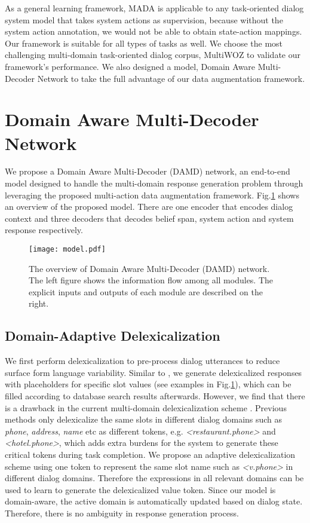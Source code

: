\documentclass[letterpaper]{article} \usepackage{aaai20}  \usepackage{times}  \usepackage{helvet} \usepackage{courier}  \usepackage[hyphens]{url}  \usepackage{graphicx} \urlstyle{rm} \def\UrlFont{\rm}  \usepackage{graphicx}  \frenchspacing  \setlength{\pdfpagewidth}{8.5in}  \setlength{\pdfpageheight}{11in}  \usepackage{multirow}
\begin{document}
	
	
	
	
	As a general learning framework, MADA is applicable to any task-oriented dialog system model that takes system actions as supervision, because without the system action annotation, we would not be able to obtain state-action mappings.  
	Our framework is suitable for all types of tasks as well. We choose the most challenging multi-domain task-oriented dialog corpus, MultiWOZ \cite{budzianowski2018multiwoz} to validate our framework's performance. We also designed a model, Domain Aware Multi-Decoder Network to take the full advantage of our data augmentation framework.
	
	
	\section{Domain Aware Multi-Decoder Network}
	We propose a Domain Aware Multi-Decoder (DAMD) network, an end-to-end model designed to handle the multi-domain response generation problem through leveraging the proposed multi-action data augmentation framework. Fig.\ref{model} shows an overview of the proposed model. There are one encoder that encodes dialog context and three decoders that decodes belief span, system action and system response respectively. 
	\begin{figure}[t!]
		\centering
		\texttt{[image: model.pdf]} 
		\caption{The overview of Domain Aware Multi-Decoder (DAMD) network. The left figure shows the information flow among all modules. The explicit inputs and outputs of each module are described on the right.}
		\label{model}
	\end{figure}
	
	\subsection{Domain-Adaptive Delexicalization}
	We first perform delexicalization to pre-process dialog utterances to reduce surface form language variability.
	Similar to \citeauthor{wen2017network} , we generate delexicalized responses with placeholders for specific slot values (see examples in Fig.\ref{model}), which can be filled according to database search results afterwards. However, we find that there is a drawback in the current multi-domain delexicalization scheme \cite{budzianowski2018multiwoz,chen2019semantically}. Previous methods only delexicalize the same slots in different dialog domains such as \textit{phone}, \textit{address}, \textit{name} etc as different tokens, e.g. \textit{\textless restaurant.phone\textgreater} and \textit{\textless hotel.phone\textgreater}, which adds extra burdens for the system to generate these critical tokens during task completion. We propose an adaptive delexicalization scheme using one token to represent the same slot name such as \textit{\textless v.phone\textgreater} in different dialog domains. Therefore the expressions in all relevant domains can be used to learn to generate the delexicalized value token. Since our model is domain-aware, the active domain is automatically updated based on dialog state. Therefore, there is no ambiguity in response generation process.\\
	
\end{document}
